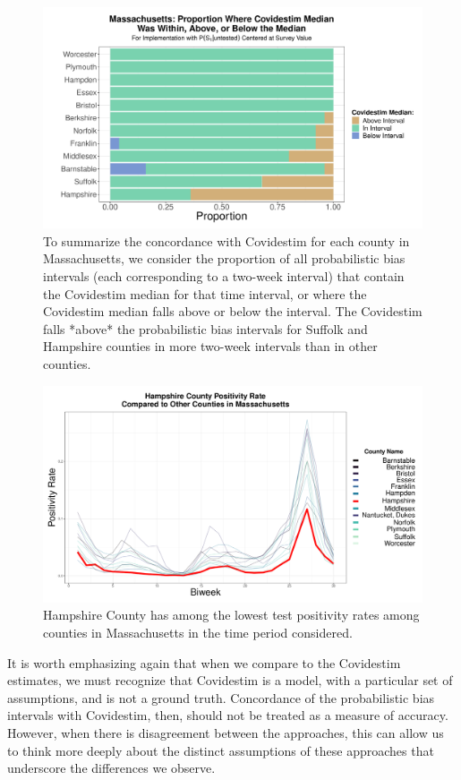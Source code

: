 \documentclass[12pt,twoside]{smiththesis}
\begin{document}
\begin{figure}
\includegraphics[width=1\linewidth]{figure/covidestim_above_below_by_county_ma} \caption{\label{fig:above-below-by-county-ma} To summarize the concordance with Covidestim for each county in Massachusetts, we consider the proportion of all probabilistic bias intervals (each corresponding to a two-week interval) that contain the Covidestim median for that time interval, or where the Covidestim median falls above or below the interval. The Covidestim falls *above* the probabilistic bias intervals for Suffolk and Hampshire counties in more two-week intervals than in other counties.}\label{fig:unnamed-chunk-92}
\end{figure}
\begin{figure}
\includegraphics[width=0.9\linewidth]{figure/hampshire} \caption{\label{fig:hamp}Hampshire County has among the lowest test positivity rates among counties in Massachusetts in the time period considered.}\label{fig:unnamed-chunk-93}
\end{figure}
It is worth emphasizing again that when we compare to the Covidestim estimates, we must recognize that Covidestim is a model, with a particular set of assumptions, and is not a ground truth. Concordance of the probabilistic bias intervals with Covidestim, then, should not be treated as a measure of accuracy. However, when there is disagreement between the approaches, this can allow us to think more deeply about the distinct assumptions of these approaches that underscore the differences we observe.
\end{document}
